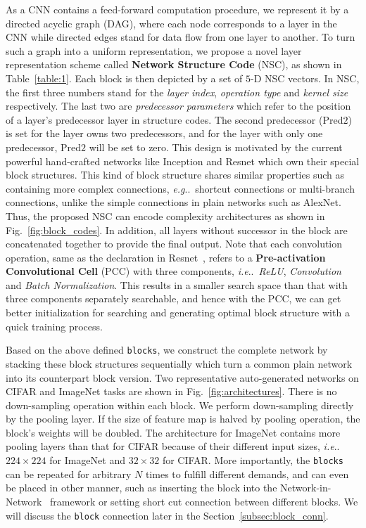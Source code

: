 \documentclass[10pt,journal,compsoc]{IEEEtran}
\makeatletter
\DeclareRobustCommand\onedot{\futurelet\@let@token\@onedot}
\def\@onedot{\ifx\@let@token.\else.\null\fi\xspace}
\def\eg{\emph{e.g}\onedot} \def\Eg{\emph{E.g}\onedot}
\def\ie{\emph{i.e}\onedot} \def\Ie{\emph{I.e}\onedot}
\makeatother
\begin{document}
As a CNN contains a feed-forward computation procedure, we represent it by a directed acyclic graph (DAG), where each node corresponds to a layer in the CNN while directed edges stand for data flow from one layer to another. To turn such a graph into a uniform representation, we propose a novel layer representation scheme called \textbf{Network Structure Code} (NSC), as shown in Table~\ref{table:1}. Each block is then depicted by a set of $5$-D NSC vectors. In NSC, the first three numbers stand for the \textit{layer index}, \textit{operation type} and \textit{kernel size} respectively. The last two are \textit{predecessor parameters} which refer to the position of a layer's predecessor layer in structure codes. The second predecessor (Pred$2$) is set for the layer owns two predecessors, and for the layer with only one predecessor, Pred$2$ will be set to zero. This design is motivated by the current powerful hand-crafted networks like Inception and Resnet which own their special block structures. This kind of block structure shares similar properties such as containing more complex connections, \eg~shortcut connections or multi-branch connections, unlike the simple connections in plain networks such as AlexNet. Thus, the proposed NSC can encode complexity architectures as shown in Fig.~\ref{fig:block_codes}. 
In addition, all layers without successor in the block are concatenated together to provide the final output.
Note that each convolution operation, same as the declaration in Resnet~\cite{he2016identity}, refers to a \textbf{Pre-activation Convolutional Cell} (PCC) with three components, \ie~\textit{ReLU}, \textit{Convolution} and \textit{Batch Normalization}.
This results in a smaller search space than that with three components separately searchable, and hence with the PCC, we can get better initialization for searching and generating optimal block structure with a quick training process.




Based on the above defined \texttt{blocks}, we construct the complete network by stacking these block structures sequentially which turn a common plain network into its counterpart block version.
Two representative auto-generated networks on CIFAR and ImageNet tasks are shown in Fig.~\ref{fig:architectures}. 
There is no down-sampling operation within each block. We perform down-sampling directly by the pooling layer. If the size of feature map is halved by pooling operation, the block's weights will be doubled.
The architecture for ImageNet contains more pooling layers than that for CIFAR because of their different input sizes, \ie~$224\times 224$ for ImageNet and $32\times 32$ for CIFAR.
More importantly, the \texttt{blocks} can be repeated for arbitrary $N$ times to fulfill different demands, and can even be placed in other manner, such as inserting the block into the Network-in-Network~\cite{lin2013network} framework or setting short cut connection between different blocks.
We will discuss the \texttt{block} connection later in the Section~\ref{subsec:block_conn}.
\end{document}
